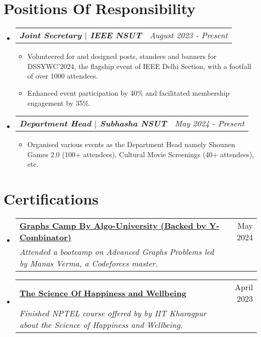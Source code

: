 \documentclass[letterpaper,11pt]{article}
\makeatletter
\newcommand{\resumeSubheading}[4]{
  \vspace{-2pt}\item
    \begin{tabular*}{0.97\textwidth}[t]{l@{\extracolsep{\fill}}r}
      \textbf{\small#1} & \small#2 \\
      \textit{\small#3} & \textit{\small #4} \\
    \end{tabular*}\vspace{-10pt}
}
\newcommand{\resumeSubSubheading}[2]{
    \item
    \begin{tabular*}{0.97\textwidth}{l@{\extracolsep{\fill}}r}
      \textit{\small#1} & \textit{\small #2} \\
    \end{tabular*}\vspace{-9pt}
}
\newcommand{\resumeSubHeadingListStart}{\begin{itemize}[leftmargin=0.15in, label={}]}
\newcommand{\resumeSubHeadingListEnd}{\end{itemize}}
\makeatother
\begin{document}
\section{Positions Of Responsibility}
  \resumeSubHeadingListStart
  \resumeSubSubheading{\textbf{Joint Secretary $|$ IEEE NSUT}}{August 2023 - Present}
  \begin{itemize}[leftmargin=0.00in, label={}]
      \item \small{Volunteered for and designed posts, standees and banners for DSSYWC'2024, the flagship event of IEEE Delhi Section, with a footfall of over 1000 attendees.}\vspace{-4pt}
      \item \small{Enhanced event participation by 40\% and facilitated membership engagement by 35\%.}\vspace{-8pt}
  \end{itemize}
  \resumeSubSubheading{\textbf{Department Head $|$ Subhasha NSUT}}{May 2024 - Present}
  \begin{itemize}[leftmargin=0.00in, label={}]
      \item \small{Organised various events as the Department Head namely Shounen Games 2.0 (100+ attendees), Cultural Movie Screenings (40+ attendees), etc.} 
  \end{itemize}
  \resumeSubHeadingListEnd

\section{Certifications}
  \resumeSubHeadingListStart
  \resumeSubheading{\href{https://drive.google.com/file/d/1qH5033p0NnD63DeI8x-vEhOdY9jHhWKa/view?usp=sharing}{Graphs Camp By Algo-University (Backed by Y-Combinator)}}{May 2024}{Attended a bootcamp on Advanced Graphs Problems led by Manas Verma, a Codeforces master.}{}
    \resumeSubheading{\href{https://drive.google.com/file/d/1pLg4yd5fhL1-FMYDrg1IVxhwm8l4tXe8/view?usp=sharing}{The Science Of Happiness and Wellbeing}}{April 2023}{Finished NPTEL course offered by  by IIT Kharagpur about the Science of Happiness and Wellbeing.}{}
  \resumeSubHeadingListEnd

\end{document}
